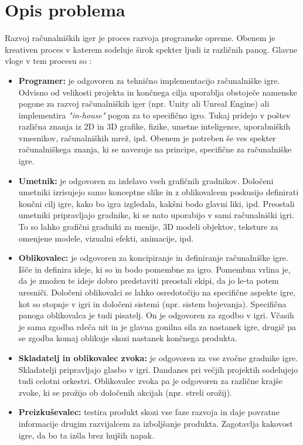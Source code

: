 \documentclass[12pt,a4paper,twoside]{book}
\begin{document}
\section{Opis problema}
\label{sec:opis_problema}
Razvoj računalniških iger je proces razvoja programske opreme. Obenem je kreativen proces v katerem sodeluje širok spekter ljudi iz različnih panog. Glavne vloge v tem procesu so \cite{rogers2014level}:
\begin{itemize}
	\item \textbf{Programer:} je odgovoren za tehnično implementacijo računalniške igre. Odvisno od velikosti projekta in končnega cilja uporablja obstoječe namenske pogone za razvoj računalniških iger (npr. Unity ali Unreal Engine) ali implementira \textit{"in-house"} pogon za to specifično igro. Tukaj pridejo v poštev različna znanja iz 2D in 3D grafike, fizike, umetne inteligence, uporabniških vmesnikov, računalniških mrež, ipd. Obenem je potreben še ves spekter računalniškega znanja, ki se navezuje na principe, specifične za računalniške igre.
	\item \textbf{Umetnik:} je odgovoren za izdelavo vseh grafičnih gradnikov. Določeni umetniki izrisujejo samo konceptne slike in z oblikovalcem poskusijo definirati končni cilj igre, kako bo igra izgledala, kakšni bodo glavni liki, ipd. Preostali umetniki pripravljajo gradnike, ki se nato uporabijo v sami računalniški igri. To so lahko grafični gradniki za menije, 3D modeli objektov, teksture za omenjene modele, vizualni efekti, animacije, ipd.
	\item \textbf{Oblikovalec:} je odgovoren za koncipiranje in definiranje računalniške igre. Išče in definira ideje, ki so in bodo pomembne za igro. Pomembna vrlina je, da je zmožen te ideje dobro predstaviti preostali ekipi, da jo le-ta potem uresniči. Določeni oblikovalci se lahko osredotočijo na specifične aspekte igre, kot so stopnje v igri in določeni sistemi (npr. sistem bojevanja).
	Specifična panoga oblikovalca je tudi pisatelj. On je odgovoren za zgodbo v igri. Včasih je sama zgodba rdeča nit in je glavna gonilna sila za nastanek igre, drugič pa se zgodba komaj oblikuje skozi nastanek končnega produkta.
	\item \textbf{Skladatelj in oblikovalec zvoka:} je odgovoren za vse zvočne gradnike igre. Skladatelji pripravljajo glasbo v igri. Dandanes pri večjih projektih sodelujejo tudi celotni orkestri. Oblikovalec zvoka pa je odgovoren za različne krajše zvoke, ki se prožijo ob določenih akcijah (npr. streli orožij).
	\item \textbf{Preizkuševalec:} testira produkt skozi vse faze razvoja in daje povratne informacije drugim razvijalcem za izboljšanje produkta. Zagotavlja kakovost igre, da bo ta izšla brez hujših napak.
\end{itemize}
\end{document}
